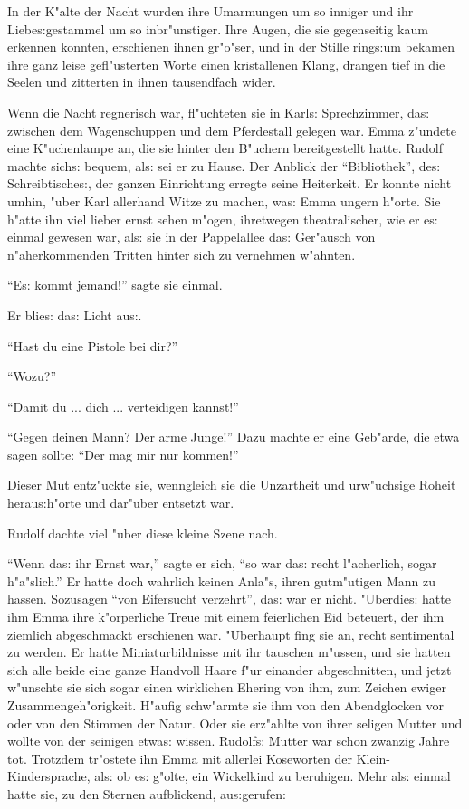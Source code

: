 \documentclass[oneside,12pt]{book}
\newcommand{\s}{s:}%
\begin{document}
In der K"alte der Nacht wurden ihre Umarmungen um so inniger und
ihr Liebe{\s}gestammel um so inbr"unstiger. Ihre Augen, die sie
gegenseitig kaum erkennen konnten, erschienen ihnen gr"o"ser, und
in der Stille ring{\s}um bekamen ihre ganz leise gefl"usterten
Worte einen kristallenen Klang, drangen tief in die Seelen und
zitterten in ihnen tausendfach wider.

Wenn die Nacht regnerisch war, fl"uchteten sie in Karl{\s}
Sprechzimmer, da{\s} zwischen dem Wagenschuppen und dem
Pferdestall gelegen war. Emma z"undete eine K"uchenlampe an, die
sie hinter den B"uchern bereitgestellt hatte. Rudolf machte
sich{\s} bequem, al{\s} sei er zu Hause. Der Anblick der
"`Bibliothek"', de{\s} Schreibtische{\s}, der ganzen Einrichtung
erregte seine Heiterkeit. Er konnte nicht umhin, "uber Karl
allerhand Witze zu machen, wa{\s} Emma ungern h"orte. Sie h"atte
ihn viel lieber ernst sehen m"ogen, ihretwegen theatralischer, wie
er e{\s} einmal gewesen war, al{\s} sie in der Pappelallee da{\s}
Ger"ausch von n"aherkommenden Tritten hinter sich zu vernehmen
w"ahnten.

"`E{\s} kommt jemand!"' sagte sie einmal.

Er blie{\s} da{\s} Licht au{\s}.

"`Hast du eine Pistole bei dir?"'

"`Wozu?"'

"`Damit du ... dich ... verteidigen kannst!"'

"`Gegen deinen Mann? Der arme Junge!"' Dazu machte er eine
Geb"arde, die etwa sagen sollte: "`Der mag mir nur kommen!"'

Dieser Mut ent\/z"uckte sie, wenngleich sie die Unzartheit und
urw"uchsige Roheit herau{\s}h"orte und dar"uber entsetzt war.

Rudolf dachte viel "uber diese kleine Szene nach.

"`Wenn da{\s} ihr Ernst war,"' sagte er sich, "`so war da{\s}
recht l"acherlich, sogar h"a"slich."' Er hatte doch wahrlich
keinen Anla"s, ihren gutm"utigen Mann zu hassen. Sozusagen "`von
Eifersucht verzehrt"', da{\s} war er nicht. "Uberdie{\s} hatte ihm
Emma ihre k"orperliche Treue mit einem feierlichen Eid beteuert,
der ihm ziemlich abgeschmackt erschienen war. "Uberhaupt fing sie
an, recht sentimental zu werden. Er hatte Miniaturbildnisse mit
ihr tauschen m"ussen, und sie hatten sich alle beide eine ganze
Handvoll Haare f"ur einander abgeschnitten, und jetzt w"unschte
sie sich sogar einen wirklichen Ehering von ihm, zum Zeichen
ewiger Zusammengeh"origkeit. H"aufig schw"armte sie ihm von den
Abendglocken vor oder von den Stimmen der Natur. Oder sie
erz"ahlte von ihrer seligen Mutter und wollte von der seinigen
etwa{\s} wissen. Rudolf{\s} Mutter war schon zwanzig Jahre tot.
Trotzdem tr"ostete ihn Emma mit allerlei Koseworten der
Klein-Kindersprache, al{\s} ob e{\s} g"olte, ein Wickelkind zu
beruhigen. Mehr al{\s} einmal hatte sie, zu den Sternen
aufblickend, au{\s}gerufen:
\end{document}
